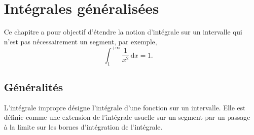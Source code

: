 \documentclass{book}
\begin{document}
\chapter{Intégrales généralisées}
Ce chapitre a pour objectif d'étendre la notion d'intégrale sur un intervalle qui n'est pas nécessairement un
segment, par exemple, $$\int_{1 }^{+\infty } \frac{1}{x^2} \,\mathrm dx = 1.$$
\begin{center}
\end{center}
\section{Généralités}
L'intégrale impropre désigne l'intégrale d'une fonction sur un intervalle. Elle est définie comme une extension de l'intégrale usuelle sur un segment  par un passage à la limite sur les bornes d'intégration de l'intégrale.   
\end{document}
